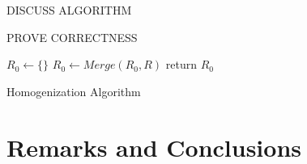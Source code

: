 \documentclass[]{elsarticle}
\theoremstyle{definition}
\theoremstyle{definition}
\begin{document}
DISCUSS ALGORITHM

PROVE CORRECTNESS


\begin{algorithm}[H]
\SetAlgoLined
{}
$R_0 \leftarrow \{\}$\;
{
   $R_0 \leftarrow Merge(R_0,R)$\;
}
return $R_0$\;
\caption{Homogenization Algorithm}
\end{algorithm}


\section{Remarks and Conclusions}\label{sec-rem-con}







 
\end{document}
